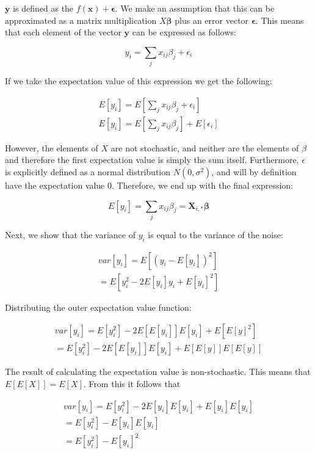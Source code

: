 \documentclass[twocolumn,10pt,cleanfoot]{asme2ej}
\begin{document}
$\bm{y}$ is defined as the $f(\bm{x}) + \bm{\epsilon}$. We make an assumption that this can be approximated as a matrix multiplication $X\bm{\beta}$ plus an error vector $\bm{\epsilon}$. This means that each element of the vector
$\bm{y}$ can be expressed as follows:

\begin{equation}
y_i = \sum_j x_{ij}\beta_j + \epsilon_i
\end{equation}

If we take the expectation value of this expression we get the following:

\begin{gather}
E[y_i] = E\left[\sum_j x_{ij}\beta_j + \epsilon_i\right] \\
E[y_i] = E\left[\sum_j x_{ij}\beta_j\right] + E[\epsilon_i]
\end{gather}

However, the elements of $X$ are not stochastic, and neither are the elements of $\beta$ and therefore the first expectation value is simply the sum itself. Furthermore, $\epsilon$ is explicitly defined as a normal distribution $N(0,\sigma^2)$, and will by definition have the expectation value $0$. Therefore, we end up with the final expression:

\begin{equation}
E[y_i] = \sum_j x_{ij}\beta_j = \bm{X}_{i,*}\bm{\beta}
\end{equation}

Next, we show that the variance of $y_i$ is equal to the variance of the noise:

\begin{gather}
var[y_i] = E\left[(y_i - E[y_i])^2\right]  \\
= E\left[y_i^2 - 2E[y_i]y_i + E[y_i]^2\right]
\end{gather}

Distributing the outer expectation value function:

\begin{gather}
var[y_i] = E[y_i^2] - 2E\left[E[y_i]\right]E[y_i] + E\left[E[y]^2\right]  \\
= E[y_i^2] - 2E\left[E[y_i]\right]E[y_i] + E\left[E[y]\right]E\left[E[y]\right]
\end{gather}

The result of calculating the expectation value is non-stochastic. This means that $E[E[X]] = E[X]$. From this it follows that

\begin{gather}
var[y_i] = E[y_i^2] - 2E[y_i]E[y_i] + E[y_i]E[y_i]  \\
= E[y_i^2] - E[y_i]E[y_i]  \\
= E[y_i^2] - E[y_i]^2
\end{gather}
\end{document}
